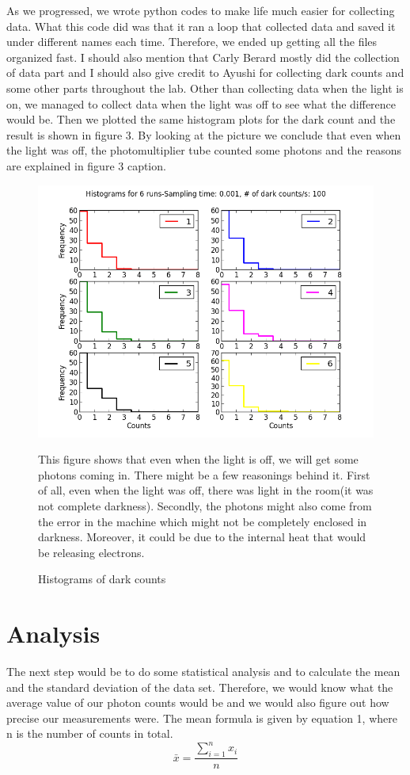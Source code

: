 \documentclass[letterpaper,12pt]{article}
\begin{document}
As we progressed, we wrote python codes to make life much easier for collecting data. What this code did was that it ran a loop that collected data and saved it under different names each time. Therefore, we ended up getting all the files organized fast. I should also mention that Carly Berard mostly did the collection of data part and I should also give credit to Ayushi for collecting dark counts and some other parts throughout the lab. 
Other than collecting data when the light is on, we managed to collect data when the light was off to see what the difference would be. Then we plotted the same histogram plots for the dark count and the result is shown in figure 3. By looking at the picture we conclude that even when the light was off, the photomultiplier tube counted some photons and the reasons are explained in figure 3 caption.

\begin{figure}
\centering
\includegraphics[scale=0.7]{Darkcounts1.png}
\caption{Histograms of dark counts}
This figure shows that even when the light is off, we will get some photons coming in. There might be a few reasonings behind it. First of all, even when the light was off, there was light in the room(it was not complete darkness). Secondly, the photons might also come from the error in the machine which might not be completely enclosed in darkness. Moreover, it could be due to the internal heat that would be releasing electrons.
\end{figure}

\section{Analysis}
\label{sec:analysis}
The next step would be to do some statistical analysis and to calculate the mean and the standard deviation of the data set. Therefore, we would know what the average value of our photon counts would be and we would also figure out how precise our measurements were.
The mean formula is given by equation 1, where n is the number of counts in total.
\begin{equation} \label{E:mean}
\bar{x} = \frac{\sum_{i=1}^{n}x_{i}} {n}
\end{equation}
\end{document}
